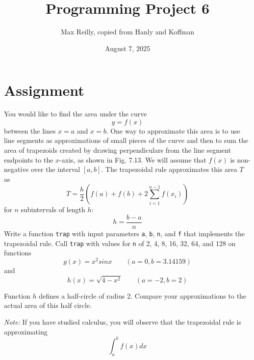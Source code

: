 \documentclass{article}
\title{Programming Project 6}
\author{Max Reilly, copied from Hanly and Koffman}
\date{August 7, 2025}
\begin{document}
    \maketitle
    \section{Assignment}
    You would like to find the area under the curve
    \begin{equation}
        y = f(x)
    \end{equation}
    between the lines $x = a$ and $x = b$. One way to approximate this area is to use
    line segments as approximations of small pieces of the curve and then to sum
    the area of trapezoids created by drawing perpendiculars from the line segment
    endpoints to the $x$-axis, as shown in Fig. 7.13. We will assume that $f(x)$
    is non-negative over the interval $[a,b]$. The trapezoidal rule approximates
    this area $T$ as
    \begin{equation}
        T = \frac{h}{2} \left(f(a) + f(b) + 2 \sum^{n-1}_{i = 1} f(x_i)\right)
    \end{equation}
    for $n$ subintervals of length $h$:
    \begin{equation}
        h = \frac{b - a}{n}
    \end{equation}
    Write a function \verb|trap| with input parameters \verb|a|, \verb|b|, \verb|n|, and \verb|f| that
    implements the trapezoidal rule. Call \verb|trap| with values for \verb|n| of 2, 4, 8, 16, 32, 64,
    and 128 on functions
    \begin{equation}
        g(x) = x^2 sinx \qquad (a = 0, b = 3.14159)
    \end{equation}
    and
    \begin{equation}
        h(x) = \sqrt{4 - x^2} \qquad (a = -2, b = 2)
    \end{equation}
    
    Function $h$ defines a half-circle of radius 2. Compare your approximations to
    the actual area of this half circle.

    {\em Note:} If you have studied calculus, you will observe that the trapezoidal
    rule is approximating
    \begin{equation}
        \int_{a}^{b} f(x)dx
    \end{equation}
\end{document}
